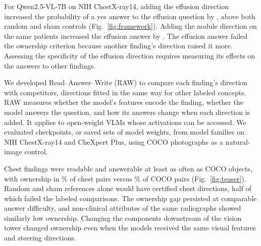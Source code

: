 For Qwen2.5-VL-7B\cite{bai2025qwen25vl} on NIH ChestX-ray14,\cite{wang2017chestxray} adding the effusion direction increased the probability of a yes answer to the effusion question by \cfSeedWEff{}, above both random and sham controls (Fig.~\ref{fig:framework}). Adding the nodule direction on the same patients increased the effusion answer by \cfSeedWNodule{}. The effusion answer failed the ownership criterion because another finding's direction raised it more. Assessing the specificity of the effusion direction requires measuring its effects on the answers to other findings.

We developed Read--Answer--Write (RAW) to compare each finding's direction with competitors, directions fitted in the same way for other labeled concepts. RAW measures whether the model's features encode the finding, whether the model answers the question, and how its answers change when each direction is added. It applies to open-weight VLMs whose activations can be accessed. We evaluated \cfCheckpoints{} checkpoints, or saved sets of model weights, from \cfFamiliesWord{} model families on NIH ChestX-ray14 and CheXpert Plus,\cite{chambon2024chexpertplus} using COCO photographs\cite{lin2014coco} as a natural-image control.

Chest findings were readable and answerable at least as often as COCO objects, with ownership in \cfChestOwnedPct{}\% of chest pairs versus \cfCocoOwnedPct{}\% of COCO pairs (Fig.~\ref{fig:teaser}). Random and sham references alone would have certified \jnRefChest{} chest directions, half of which failed the labeled comparisons. The ownership gap persisted at comparable answer difficulty, and non-clinical attributes of the same radiographs showed similarly low ownership. Changing the components downstream of the vision tower changed ownership even when the models received the same visual features and steering directions.
